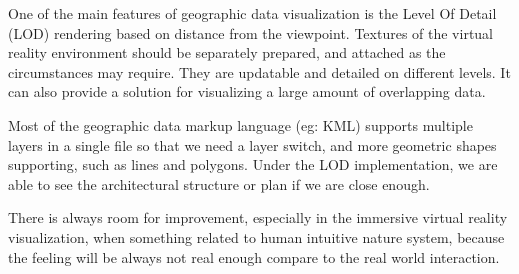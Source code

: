 One of the main features of geographic data visualization is the Level Of Detail (LOD) rendering based on distance from the viewpoint. Textures of the virtual reality environment should be separately prepared, and attached as the circumstances may require. They are updatable and detailed on different levels. It can also provide a solution for visualizing a large amount of overlapping data.

Most of the geographic data markup language (eg: KML) supports multiple layers in a single file so that we need a layer switch, and more geometric shapes supporting, such as lines and polygons. Under the LOD implementation, we are able to see the architectural structure or plan if we are close enough.

There is always room for improvement, especially in the immersive virtual reality visualization, when something related to human intuitive nature system, because the feeling will be always not real enough compare to the real world interaction.

